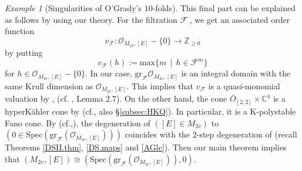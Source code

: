\documentclass[12pt,a4paper]{amsart}
\newtheorem{Rem}[Thm]{Remark}
\theoremstyle{remark}
\newtheorem{ex}[Thm]{Example}
\theoremstyle{definition}
\def\C{\mathbb{C}}
\begin{document}
\begin{ex}[Singularities of O'Grady's $10$-folds]
This final part can be explained as follows by using our theory. 
For the filtration $\mathcal{F}^{\cdot}$, we get an associated order function $$v_{\mathcal{F}} : \mathcal{O}_{{M_{2v}}, [E]} - \{0\} 
\to \mathbb{Z}_{\geq 0}$$ by putting 
$$v_{\mathcal{F}}(h) := \mathrm{max}\{m \:\: \vert \:\: h \in \mathcal{F}^m\}$$ for $h \in \mathcal{O}_{{M_{2v}}, [E]} - \{0\}$. 
In our case, $\mathrm{gr}_{\mathcal{F}}\mathcal{O}_{{M_{2v}}, [E]}$ is an integral domain with the same Krull dimension as 
$\mathcal{O}_{{M_{2v}}, [E]}$. This implies that $v_{\mathcal F}$ is a quasi-monomial valuation by  \cite{Tei03}, \cite{Tei14} (cf. \cite{LLX}, Lemma 2.7).    
On the other hand, the cone $\bar{O}_{[2,2]} \times \mathbb{C}^4$ is a hyperK\"ahler cone by \cite[Theorem 1.1]{KS} (cf., also \S \ref{subsec:HKQ}). 
In particular, it is a K-polystable Fano cone. By  \cite[Theorem 1.3]{LX} (cf.,\cite[Theorem 4.14]{LLX}), the degeneration of $([E] \in M_{2v})$  to $(0 \in \mathrm{Spec}(\mathrm{gr}_{\mathcal F}(\mathcal{O}_{{M_{2v}}, [E]})))$ 
coincides with the $2$-step degeneration of \cite{DSII} 
(recall Theorems \ref{DSII.thm}, \ref{DS.maps} and 
\ref{AGlc}). 
Then our main theorem implies that 
$(M_{2v}, [E]) \cong (\mathrm{Spec}(\mathrm{gr}_{\mathcal F}(\mathcal{O}_{{M_{2v}}, [E]})), 0)$. 
    
\end{ex}

\end{document}
